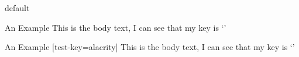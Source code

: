 \begin{ExampleBlock}{}

 {\testKeyValue} {default}

\begin{TestObject}{An Example}
    This is the body text, I can see that my key is `'
\end{TestObject}

\vspace{0.5cm}

\begin{TestObject} {An Example} [test-key=alacrity]
    This is the body text, I can see that my key is `'
\end{TestObject}

\end{ExampleBlock}
